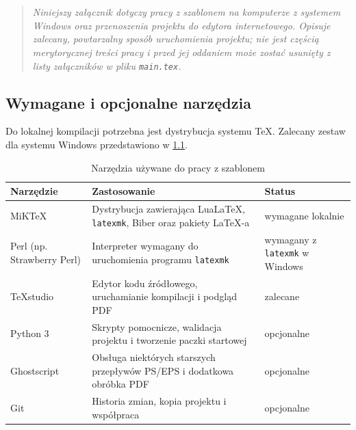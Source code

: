 {}

\chapter{}
\label{app:kompilacja}

\begin{quote}\itshape
  Niniejszy załącznik dotyczy pracy z szablonem na komputerze z systemem Windows oraz przenoszenia projektu do edytora internetowego. Opisuje zalecany, powtarzalny sposób uruchomienia projektu; nie jest częścią merytorycznej treści pracy i przed jej oddaniem może zostać usunięty z listy załączników w pliku \texttt{main.tex}.
\end{quote}

\section{Wymagane i opcjonalne narzędzia}

Do lokalnej kompilacji potrzebna jest dystrybucja systemu TeX. Zalecany zestaw dla systemu Windows przedstawiono w \cref{tab:narzedzia-kompilacja}.

\begin{table}[htbp]
  \centering
  \caption{Narzędzia używane do pracy z szablonem}
  \label{tab:narzedzia-kompilacja}
  \begin{tabularx}{\textwidth}{@{}p{}X p{}@{}}
    \toprule
    Narzędzie & Zastosowanie & Status \\
    \midrule
    MiKTeX & Dystrybucja zawierająca LuaLaTeX, \texttt{latexmk}, Biber oraz pakiety LaTeX-a & wymagane lokalnie \\
    Perl (np. Strawberry Perl) & Interpreter wymagany do uruchomienia programu \texttt{latexmk} & wymagany z \texttt{latexmk} w Windows \\
    TeXstudio & Edytor kodu źródłowego, uruchamianie kompilacji i podgląd PDF & zalecane \\
    Python 3 & Skrypty pomocnicze, walidacja projektu i tworzenie paczki startowej & opcjonalne \\
    Ghostscript & Obsługa niektórych starszych przepływów PS/EPS i dodatkowa obróbka PDF & opcjonalne \\
    Git & Historia zmian, kopia projektu i współpraca & opcjonalne \\
    \bottomrule
  \end{tabularx}
\end{table}

